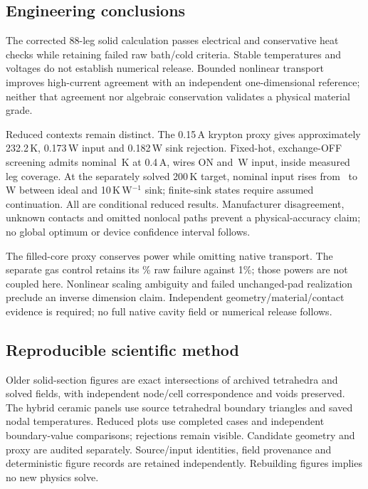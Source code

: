 \documentclass[11pt,a4paper]{article}
\begin{document}
\subsection{Engineering conclusions}
The corrected 88-leg solid calculation passes electrical and conservative heat checks while retaining failed raw bath/cold criteria. Stable temperatures and voltages do not establish numerical release. Bounded nonlinear transport improves high-current agreement with an independent one-dimensional reference; neither that agreement nor algebraic conservation validates a physical material grade.

Reduced contexts remain distinct. The 0.15\,A krypton proxy gives approximately 232.2\,K, 0.173\,W input and 0.182\,W sink rejection. Fixed-hot, exchange-OFF screening admits nominal \ScreenDie\,K at 0.4\,A, wires ON and \ScreenPower\,W input, inside measured leg coverage. At the separately solved 200\,K target, nominal input rises from \SinkIdealPower\ to \SinkFinalPower\,W between ideal and 10\,K\,W$^{-1}$ sink; finite-sink states require assumed continuation. All are conditional reduced results. Manufacturer disagreement, unknown contacts and omitted nonlocal paths prevent a physical-accuracy claim; no global optimum or device confidence interval follows.

The filled-core proxy conserves power while omitting native transport. The separate gas control retains its \GasRawMismatch\% raw failure against 1\%; those powers are not coupled here. Nonlinear scaling ambiguity and failed unchanged-pad realization preclude an inverse dimension claim. Independent geometry/material/contact evidence is required; no full native cavity field or numerical release follows.

\subsection{Reproducible scientific method}
Older solid-section figures are exact intersections of archived tetrahedra and solved fields, with independent node/cell correspondence and voids preserved. The hybrid ceramic panels use source tetrahedral boundary triangles and saved nodal temperatures. Reduced plots use completed cases and independent boundary-value comparisons; rejections remain visible. Candidate geometry and proxy are audited separately. Source/input identities, field provenance and deterministic figure records are retained independently. Rebuilding figures implies no new physics solve.
\end{document}
